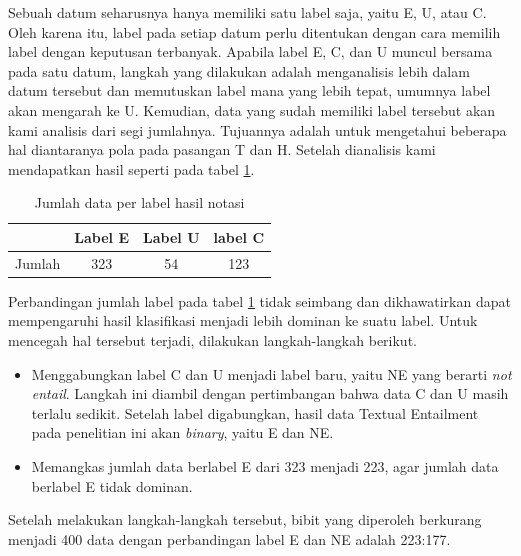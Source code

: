 Sebuah datum seharusnya hanya memiliki satu label saja, yaitu E, U, atau C. Oleh karena itu, label pada setiap datum perlu ditentukan dengan cara memilih label dengan keputusan terbanyak. Apabila label E, C, dan U muncul bersama pada satu datum, langkah yang dilakukan adalah menganalisis lebih dalam datum tersebut dan memutuskan label mana yang lebih tepat, umumnya label akan mengarah ke U. Kemudian, data yang sudah memiliki label tersebut akan kami analisis dari segi jumlahnya. Tujuannya adalah untuk mengetahui beberapa hal diantaranya pola pada pasangan T dan H. Setelah dianalisis kami mendapatkan hasil seperti pada tabel \ref{table:dataEUC}.
\begin{table}
	\centering
	\caption{Jumlah data per label hasil notasi}
	\label{table:dataEUC}
	\begin{tabular}{|c|c|c|c|}
		\hline
		\textbf & Label E & Label U & label C \\ \hline
		Jumlah  & 323 & 54 & 123 \\ \hline
	\end{tabular}
\end{table}
Perbandingan jumlah label pada tabel \ref{table:dataEUC} tidak seimbang dan dikhawatirkan dapat  mempengaruhi hasil klasifikasi menjadi lebih dominan ke suatu label. Untuk mencegah hal tersebut terjadi, dilakukan langkah-langkah berikut. 
\begin{itemize}
	\item Menggabungkan label C dan U menjadi label baru, yaitu NE yang berarti \textit{not entail}. Langkah ini diambil dengan pertimbangan bahwa data C dan U masih terlalu sedikit. Setelah label digabungkan, hasil data Textual Entailment pada penelitian ini akan \textit{binary}, yaitu E dan NE.
	\item Memangkas jumlah data berlabel E dari 323 menjadi 223, agar jumlah data berlabel E tidak dominan.
\end{itemize}
\noindent Setelah melakukan langkah-langkah tersebut, bibit yang diperoleh berkurang menjadi 400 data dengan perbandingan label E dan NE adalah 223:177.

